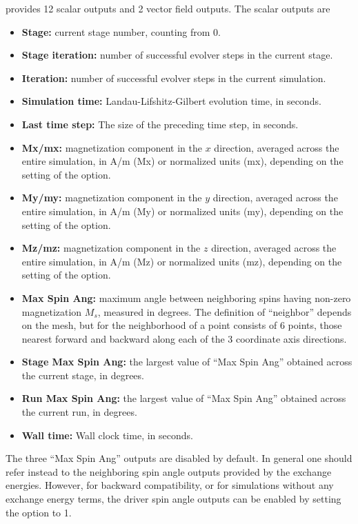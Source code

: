\begin{description}
 provides 12 scalar outputs and 2 vector field
outputs.  The scalar outputs are
\begin{itemize}
\item \textbf{Stage:} current stage number, counting from 0.
\item \textbf{Stage iteration:} number of successful evolver steps
in the current stage.
\item \textbf{Iteration:} number of successful evolver steps in the
current simulation.
\item \textbf{Simulation time:} Landau-Lifshitz-Gilbert evolution
time, in seconds.
\item \textbf{Last time step:} The size of the preceding time step, in
seconds.
\item \textbf{Mx/mx:} magnetization component in the $x$ direction,
averaged across the entire simulation, in A/m (Mx) or normalized units
(mx), depending on the setting of the 
option.
\item \textbf{My/my:} magnetization component in the $y$ direction,
averaged across the entire simulation, in A/m (My) or normalized units
(my), depending on the setting of the 
option.
\item \textbf{Mz/mz:} magnetization component in the $z$ direction,
averaged across the entire simulation, in A/m (Mz) or normalized units
(mz), depending on the setting of the 
option.
\item \textbf{Max Spin Ang:} maximum angle between neighboring spins
having non-zero magnetization $M_s$, measured in degrees.  The definition
of ``neighbor'' depends on the mesh, but for 
the neighborhood of a point consists of 6 points, those nearest
forward and backward along each of the 3 coordinate axis directions.
\item \textbf{Stage Max Spin Ang:} the largest value of ``Max Spin
Ang'' obtained across the current stage, in degrees.
\item \textbf{Run Max Spin Ang:} the largest value of ``Max Spin
Ang'' obtained across the current run, in degrees.
\item \textbf{Wall time:} Wall clock time, in seconds.
\end{itemize}
The three ``Max Spin Ang'' outputs are disabled by default.  In general
one should refer instead to the neighboring spin angle outputs provided
by the exchange energies.  However, for backward compatibility, or for
simulations without any exchange energy terms, the driver spin angle
outputs can be enabled by setting
the  option to 1.


\end{description}
